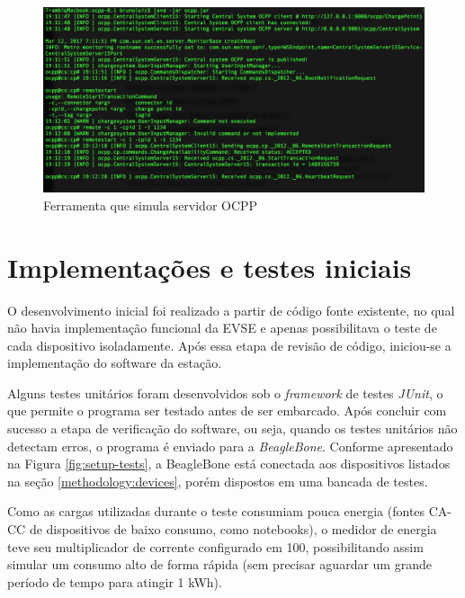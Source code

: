     \begin{figure}[H]
      \begin{center}
        \includegraphics[width=1.0\textwidth,natwidth=2130,natheight=1420,angle=0]{assets/images/ocpp-tool-snap.jpg}
        \caption{Ferramenta que simula servidor OCPP}
        \label{fig:ocpp-tool-snap}
      \end{center}
    \end{figure}

  \section{Implementações e testes iniciais}
  \label{tests:initial}

    O desenvolvimento inicial foi realizado a partir de código fonte existente, no qual não havia implementação funcional da EVSE e apenas possibilitava o teste de cada dispositivo isoladamente. Após essa etapa de revisão de código, iniciou-se a implementação do software da estação.

    Alguns testes unitários foram desenvolvidos sob o \textit{framework} de testes \textit{JUnit}, o que permite o programa ser testado antes de ser embarcado. Após concluir com sucesso a etapa de verificação do software, ou seja, quando os testes unitários não detectam erros, o programa é enviado para a \textit{BeagleBone}. Conforme apresentado na Figura \ref{fig:setup-tests}, a BeagleBone está conectada aos dispositivos listados na seção \ref{methodology:devices}, porém dispostos em uma bancada de testes.

    Como as cargas utilizadas durante o teste consumiam pouca energia (fontes \ac{CA}-\ac{CC} de dispositivos de baixo consumo, como notebooks), o medidor de energia teve seu multiplicador de corrente configurado em 100, possibilitando assim simular um consumo alto de forma rápida (sem precisar aguardar um grande período de tempo para atingir 1 kWh).

